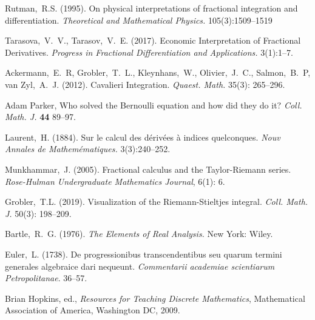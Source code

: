 \documentclass{article}
\theoremstyle{theorem}
\theoremstyle{definition}
\begin{document}
\begin{thebibliography}{1}
 Rutman,~R.S. (1995). On physical interpretations of fractional integration and differentiation. \textit{Theoretical and Mathematical Physics.} 105(3):1509--1519

 Tarasova,~V.~V., Tarasov,~V.~E. (2017). Economic Interpretation of Fractional Derivatives. \textit{Progress in Fractional Differentiation and Applications.} 3(1):1--7. 

 Ackermann,~E.~R, Grobler,~T.~L., Kleynhans,~W., Olivier,~J.~C., Salmon,~B.~P, van Zyl,~A.~J. (2012). Cavalieri
Integration. \textit{Quaest. Math.} 35(3): 265–296.

 Adam Parker, Who solved the Bernoulli equation and how did they do it? \textit{Coll. Math. J.} \textbf{44} 89--97.

 Laurent,~H. (1884). Sur le calcul des d\'{e}riv\'{e}es \`{a} indices quelconques. \textit{Nouv Annales de Mathem\'{e}matiques.} 3(3):240--252. 

 Munkhammar,~J. (2005). Fractional calculus and the Taylor-Riemann series. \textit{Rose-Hulman Undergraduate Mathematics Journal}, 6(1): 6.

 Grobler,~T.L. (2019). Visualization of the Riemann-Stieltjes integral. \textit{Coll. Math. J.} 50(3): 198--209.

 Bartle,~R.~G. (1976). \textit{The Elements of Real Analysis.} New York: Wiley.

 Euler,~L. (1738). De progressionibus transcendentibus seu quarum termini generales algebraice dari nequeunt. \textit{Commentarii academiae scientiarum Petropolitanae}. 36--57.

 Brian Hopkins, ed., \textit{Resources for Teaching Discrete Mathematics}, Mathematical Association of America, Washington DC, 2009.
\end{thebibliography}
\vfill\eject
\end{document}
